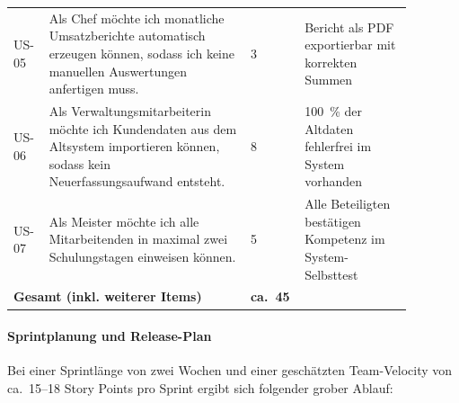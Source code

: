 \documentclass[
    a4paper,
    11pt,
    bibliography=totoc,
    listof=totoc,
    parskip=half,
    headings=normal
]{scrbook}
\begin{document}
\begin{longtable}{@{}p{0.08\linewidth}p{0.47\linewidth}p{0.08\linewidth}p{0.25\linewidth}@{}}
      US-05                                                      & Als Chef möchte ich monatliche Umsatzberichte automatisch erzeugen können, sodass ich keine manuellen Auswertungen anfertigen muss.     & 3                     & Bericht als PDF exportierbar mit korrekten Summen                   \\
      US-06                                                      & Als Verwaltungsmitarbeiterin möchte ich Kundendaten aus dem Altsystem importieren können, sodass kein Neuerfassungsaufwand entsteht.    & 8                     & 100~\% der Altdaten fehlerfrei im System vorhanden                  \\
      US-07                                                      & Als Meister möchte ich alle Mitarbeitenden in maximal zwei Schulungstagen einweisen können.                                             & 5                     & Alle Beteiligten bestätigen Kompetenz im System-Selbsttest          \\
      \midrule
      \multicolumn{2}{l}{\textbf{Gesamt (inkl. weiterer Items)}} & \textbf{ca.\ 45}                                                                                                                        &                                                                                             \\
      \bottomrule
\end{longtable}

\paragraph{Sprintplanung und Release-Plan}

Bei einer Sprintlänge von zwei Wochen und einer geschätzten Team-Velocity von
ca.\ 15--18 Story Points pro Sprint ergibt sich folgender grober Ablauf\autocite[vgl.][Kap.~3]{Reppin2020}:
\end{document}

